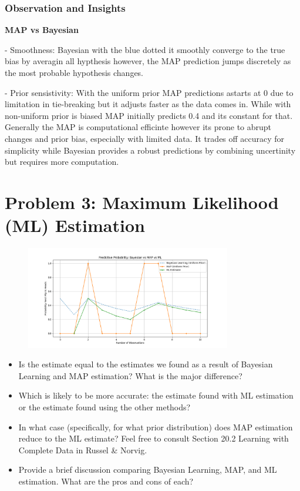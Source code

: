 \documentclass{article}
\begin{document}
\subsubsection*{Observation and Insights}
\textbf{MAP vs Bayesian}

- Smoothness: Bayesian with the blue dotted it smoothly converge  to the true bias by averagin all hypthesis however, the MAP prediction jumps discretely as the most probable hypothesis changes.

- Prior sensistivity: With the uniform prior MAP predictions astarts at 0 due to limitation in tie-breaking but it adjusts faster as the data comes in. While with non-uniform
prior is biased  MAP initially predicts 0.4 and its constant for that. \\

Generally the MAP is computational efficinte however its prone to abrupt changes and prior bias, especially with limited data. It trades off accuracy for simplicity while Bayesian provides a robust predictions
by combining uncertinity but requires more computation.


\clearpage

\section*{Problem 3: Maximum Likelihood (ML) Estimation}
\begin{figure}[H]
    \centering
    \includegraphics[width=0.8\textwidth]{../Problem3/Comparizon_ML_MAP_Bayesian.png}
    \label{fig:num_of_observation}
\end{figure}
\begin{itemize}
    \item Is the estimate equal to the estimates we found as a result of Bayesian Learning and MAP estimation? What is the major difference?
    \item Which is likely to be more accurate: the estimate found with ML estimation or the estimate found using the other methods?
    \item In what case (specifically, for what prior distribution) does MAP estimation reduce to the ML estimate? Feel free to consult Section 20.2 Learning with Complete Data in Russel \& Norvig.
    \item Provide a brief discussion comparing Bayesian Learning, MAP, and ML estimation. What are the pros and cons of each?
\end{itemize}
\end{document}
